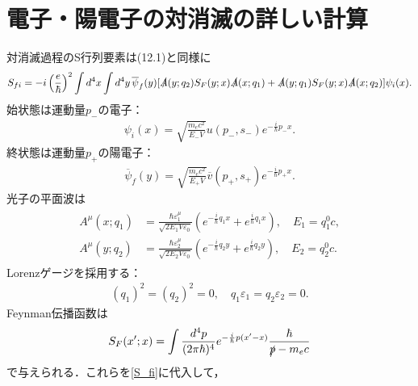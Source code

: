 \section*{電子・陽電子の対消滅の詳しい計算}
対消滅過程のS行列要素は(12.1)と同様に
\begin{align}
  S_{fi} = -i\left(\frac{e}{\hbar}\right)^2\int d^4x\int d^4y\,\overline{\psi}_f(y)[\slashed{A}(y;q_2)S_F(y;x)\slashed{A}(x;q_1) + \slashed{A}(y;q_1)S_F(y;x)\slashed{A}(x;q_2)]\psi_i(x).\label{S_fi}
\end{align}
始状態は運動量$p_-$の電子：
\begin{align}
  \psi_i(x) = \sqrt{\frac{m_ec^2}{E_-V}}u(p_-,s_-)e^{-\frac{i}{\hbar}p_-x}.\label{psi_i}
\end{align}
終状態は運動量$p_+$の陽電子：
\begin{align}
  \overline{\psi}_f(y) = \sqrt{\frac{m_ec^2}{E_+V}}\overline{v}(p_+,s_+)e^{-\frac{i}{\hbar}p_+x}.\label{psi_f}
\end{align}
光子の平面波は
\begin{align}
  \begin{split}
    A^\mu(x;q_1) &= \frac{\hbar\varepsilon_1^\mu}{\sqrt{2E_1V\varepsilon_0}}(e^{-\frac{i}{\hbar}q_1x}+e^{\frac{i}{\hbar}q_1x}),\quad E_1 = q_1^0c, \\
    A^\mu(y;q_2) &= \frac{\hbar\varepsilon_2^\mu}{\sqrt{2E_2V\varepsilon_0}}(e^{-\frac{i}{\hbar}q_2y}+e^{\frac{i}{\hbar}q_2y}),\quad E_2 = q_2^0c.
  \end{split}\label{A}
\end{align}
Lorenzゲージを採用する：
\begin{align}
  (q_1)^2=(q_2)^2=0,\quad q_1\varepsilon_1=q_2\varepsilon_2=0.\label{LorenzGauge}
\end{align}
Feynman伝播函数は
\begin{align}
  S_F(x';x) = \int\frac{d^4p}{(2\pi\hbar)^4}e^{-\frac{i}{\hbar}p(x'-x)}\frac{\hbar}{\slashed{p}-m_ec}\label{FeynmanPropagator}
\end{align}
で与えられる．これらを\eqref{S_fi}に代入して，
